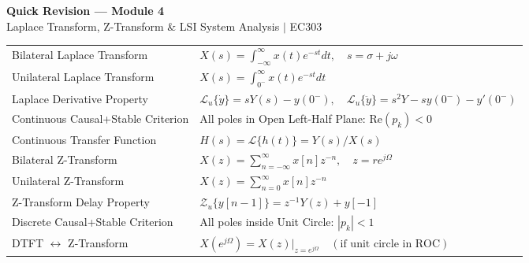 \documentclass[12pt,a4paper]{article}
\renewcommand{\arraystretch}{1.45}
\begin{document}
\newpage
\begin{center}
  {\large\bfseries\color{myred} Quick Revision --- Module 4}\\[3pt]
  {\small\color{mydark} Laplace Transform, Z-Transform \& LSI System Analysis $|$ EC303}
\end{center}
\noindent{\color{myred}\rule{\linewidth}{1.2pt}}
\vspace{4pt}

\begin{tcolorbox}[formulabox, title={\textbf{Key Formulas at a Glance}}]
\renewcommand{\arraystretch}{1.35}
\begin{tabularx}{\linewidth}{B{5.0cm} X}
Bilateral Laplace Transform & $X(s) = \int_{-\infty}^{\infty} x(t) e^{-st} dt, \quad s = \sigma + j\omega$ \\[4pt]
Unilateral Laplace Transform & $X(s) = \int_{0^-}^{\infty} x(t) e^{-st} dt$ \\[4pt]
Laplace Derivative Property & $\mathcal{L}_u\{\dot{y}\} = s Y(s) - y(0^-), \quad \mathcal{L}_u\{\ddot{y}\} = s^2 Y - s y(0^-) - y'(0^-)$ \\[4pt]
Continuous Causal+Stable Criterion & All poles in Open Left-Half Plane: $\text{Re}(p_k) < 0$ \\[4pt]
Continuous Transfer Function & $H(s) = \mathcal{L}\{h(t)\} = Y(s) / X(s)$ \\[4pt]
Bilateral Z-Transform & $X(z) = \sum_{n=-\infty}^{\infty} x[n] z^{-n}, \quad z = r e^{j\Omega}$ \\[4pt]
Unilateral Z-Transform & $X(z) = \sum_{n=0}^{\infty} x[n] z^{-n}$ \\[4pt]
Z-Transform Delay Property & $\mathcal{Z}_u\{y[n-1]\} = z^{-1} Y(z) + y[-1]$ \\[4pt]
Discrete Causal+Stable Criterion & All poles inside Unit Circle: $|p_k| < 1$ \\[4pt]
DTFT $\leftrightarrow$ Z-Transform & $X(e^{j\Omega}) = \left. X(z) \right|_{z = e^{j\Omega}} \quad (\text{if unit circle in ROC})$ \\[4pt]
\end{tabularx}
\end{tcolorbox}
\end{document}
